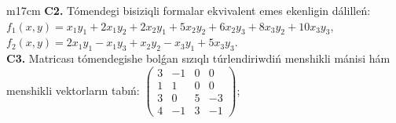 \documentclass{article}
\begin{document}
\begin{tabular}{m{17cm}}
\textbf{C2.} Tómendegi bisiziqli formalar ekvivalent emes ekenligin dálilleń:\(f_{1}(x,y) = x_{1}y_{1} + 2x_{1}y_{2} + 2x_{2}y_{1} + 5x_{2}y_{2} + 6x_{2}y_{3} + 8x_{3}y_{2} + 10x_{3}y_{3}\), \(f_{2}(x,y) = 2x_{1}y_{1} - x_{1}y_{3} + x_{2}y_{2} - x_{3}y_{1} + 5x_{3}y_{3}\). \\
\textbf{C3.} Matricası tómendegishe bolǵan sızıqlı túrlendiriwdiń menshikli mánisi hám menshikli vektorların tabıń: \(\begin{pmatrix} 3 & - 1 & 0 & 0 \\ 1 & 1 & 0 & 0 \\ 3 & 0 & 5 & - 3 \\ 4 & - 1 & 3 & - 1 \end{pmatrix}\); \\

\end{tabular}
\vspace{1cm}
\end{document}
